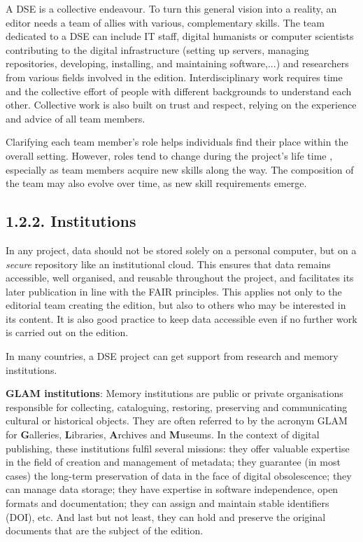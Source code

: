 \documentclass[
  letterpaper,
  DIV=11,
  numbers=noendperiod]{scrreprt}
\begin{document}
A DSE is a collective endeavour. To turn this general vision into a
reality, an editor needs a team of allies with various, complementary
skills. The team dedicated to a DSE can include IT staff, digital
humanists or computer scientists contributing to the digital
infrastructure (setting up servers, managing repositories, developing,
installing, and maintaining software,...) and researchers from various
fields involved in the edition. Interdisciplinary work requires time and
the collective effort of people with different backgrounds to understand
each other. Collective work is also built on trust and respect, relying
on the experience and advice of all team members.

Clarifying each team member's role helps individuals find their place
within the overall setting. However, roles tend to change during the
project's life time , especially as team members acquire new skills
along the way. The composition of the team may also evolve over time, as
new skill requirements emerge.

\subsection*{1.2.2. Institutions}\label{institutions}

In any project, data should not be stored solely on a personal computer,
but on a \emph{secure} repository like an institutional cloud. This
ensures that data remains accessible, well organised, and reusable
throughout the project, and facilitates its later publication in line
with the FAIR principles. This applies not only to the editorial team
creating the edition, but also to others who may be interested in its
content. It is also good practice to keep data accessible even if no
further work is carried out on the edition.\hl{}

In many countries, a DSE project can get support from research and
memory institutions.\hl{}

\textbf{GLAM institutions}: Memory institutions are public or private
organisations responsible for collecting, cataloguing, restoring,
preserving and communicating cultural or historical objects. They are
often referred to by the acronym GLAM for \textbf{G}alleries,
\textbf{L}ibraries, \textbf{A}rchives and \textbf{M}useums. In the
context of digital publishing, these institutions fulfil several
missions: they offer valuable expertise in the field of creation and
management of metadata; they guarantee (in most cases) the long-term
preservation of data in the face of digital obsolescence; they can
manage data storage; they have expertise in software independence, open
formats and documentation; they can assign and maintain stable
identifiers (DOI), etc. And last but not least, they can hold and
preserve the original documents that are the subject of the edition.
\end{document}
